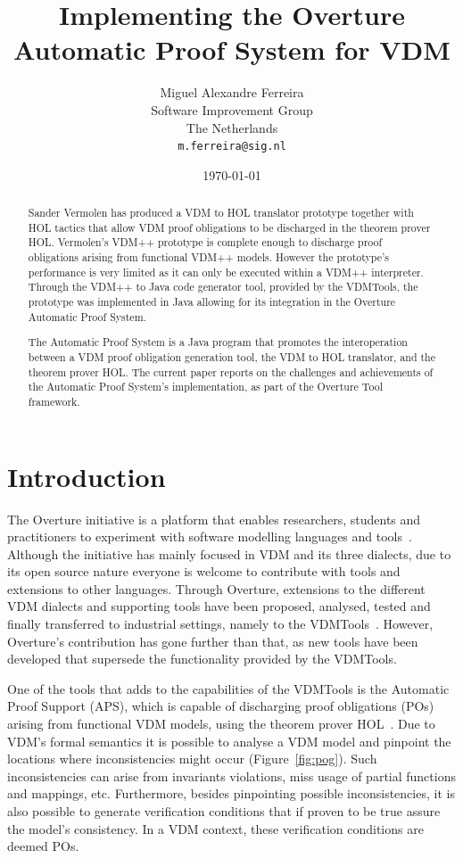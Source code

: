 \documentclass[]{article}
\title{Implementing the Overture Automatic Proof System for VDM}
\author{Miguel Alexandre Ferreira\\
        Software Improvement Group\\
		The Netherlands\\ 
		\texttt{m.ferreira@sig.nl}}
\date{\today}
\begin{document}
\maketitle
\begin{abstract}
Sander Vermolen has produced a VDM to HOL translator prototype together with HOL tactics that allow VDM proof obligations to be discharged in the theorem prover HOL.
Vermolen's VDM++ prototype is complete enough to discharge proof obligations arising from functional VDM++ models.
However the prototype's performance is very limited as it can only be executed within a VDM++ interpreter.
Through the VDM++ to Java code generator tool, provided by the VDMTools, the prototype was implemented in Java allowing for its integration in the Overture Automatic Proof System.

The Automatic Proof System is a Java program that promotes the interoperation between a VDM proof obligation generation tool, the VDM to HOL translator, and the theorem prover HOL.
The current paper reports on the challenges and achievements of the Automatic Proof System's implementation, as part of the Overture Tool framework.
\end{abstract}

\section{Introduction}
\label{sec:introduction}

The Overture initiative is a platform that enables researchers, students and practitioners to experiment with software modelling languages and tools~\cite{OverturePaper}.
Although the initiative has mainly focused in VDM and its three dialects, due to its open source nature everyone is welcome to contribute with tools and extensions to other languages.
Through Overture, extensions to the different VDM dialects and supporting tools have been proposed, analysed, tested and finally transferred to industrial settings, namely to the VDMTools~\cite{VDMTools}.
However, Overture's contribution has gone further than that, as new tools have been developed that supersede the functionality provided by the VDMTools.

One of the tools that adds to the capabilities of the VDMTools is the Automatic Proof Support (APS), which is capable of discharging proof obligations (POs) arising from functional VDM models, using the theorem prover HOL~\cite{HOL}.
Due to VDM's formal semantics it is possible to analyse a VDM model and pinpoint the locations where inconsistencies might occur (Figure~\ref{fig:pog}).
Such inconsistencies can arise from invariants violations, miss usage of partial functions and mappings, etc.
Furthermore, besides pinpointing possible inconsistencies, it is also possible to generate verification conditions that if proven to be true assure the model's consistency.
In a VDM context, these verification conditions are deemed POs.
\end{document}
